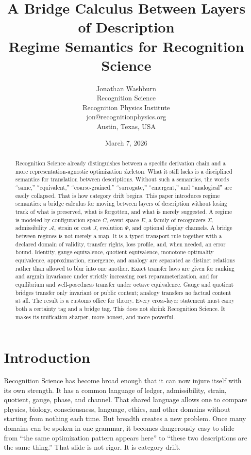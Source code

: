\documentclass[11pt]{article}
\title{A Bridge Calculus Between Layers of Description\\Regime Semantics for Recognition Science}
\author{Jonathan Washburn\\Recognition Science\\Recognition Physics Institute\\jon@recognitionphysics.org\\Austin, Texas, USA}
\date{March 7, 2026}
\begin{document}
\maketitle

\begin{abstract}
Recognition Science already distinguishes between a specific derivation chain and a more representation-agnostic optimization skeleton. What it still lacks is a disciplined semantics for translation between descriptions. Without such a semantics, the words ``same,'' ``equivalent,'' ``coarse-grained,'' ``surrogate,'' ``emergent,'' and ``analogical'' are easily collapsed. That is how category drift begins. This paper introduces regime semantics: a bridge calculus for moving between layers of description without losing track of what is preserved, what is forgotten, and what is merely suggested. A regime is modeled by configuration space $C$, event space $E$, a family of recognizers $\Sigma$, admissibility $\mathcal{A}$, strain or cost $J$, evolution $\Phi$, and optional display channels. A bridge between regimes is not merely a map. It is a typed transport rule together with a declared domain of validity, transfer rights, loss profile, and, when needed, an error bound. Identity, gauge equivalence, quotient equivalence, monotone-optimality equivalence, approximation, emergence, and analogy are separated as distinct relations rather than allowed to blur into one another. Exact transfer laws are given for ranking and argmin invariance under strictly increasing cost reparameterization, and for equilibrium and well-posedness transfer under octave equivalence. Gauge and quotient bridges transfer only invariant or public content; analogy transfers no factual content at all. The result is a customs office for theory. Every cross-layer statement must carry both a certainty tag and a bridge tag. This does not shrink Recognition Science. It makes its unification sharper, more honest, and more powerful.
\end{abstract}

\section{Introduction}

Recognition Science has become broad enough that it can now injure itself with its own strength. It has a common language of ledger, admissibility, strain, quotient, gauge, phase, and channel. That shared language allows one to compare physics, biology, consciousness, language, ethics, and other domains without starting from nothing each time. But breadth creates a new problem. Once many domains can be spoken in one grammar, it becomes dangerously easy to slide from ``the same optimization pattern appears here'' to ``these two descriptions are the same thing.'' That slide is not rigor. It is category drift.
\end{document}
